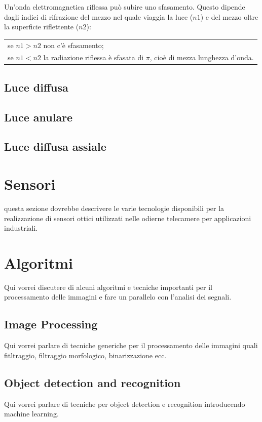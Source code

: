 Un'onda elettromagnetica riflessa può subire uno sfasamento. Questo dipende dagli indici di rifrazione del mezzo nel quale viaggia la luce ($n1$) e del mezzo oltre la superficie riflettente ($n2$):

\begin{tabular}{l}
se $n1>n2$ non c'è sfasamento;\\
se $n1<n2$ la radiazione riflessa è sfasata di $\pi$, cioè di mezza lunghezza d'onda.\\
\end{tabular}

\subsection{Luce diffusa}

\subsection{Luce anulare}

\subsection{Luce diffusa assiale}

\section{Sensori}

questa sezione dovrebbe descrivere le varie tecnologie disponibili per la realizzazione di
sensori ottici utilizzati nelle odierne telecamere per applicazioni industriali.

\section{Algoritmi}
Qui vorrei discutere di alcuni algoritmi e tecniche importanti per il processamento delle immagini
e fare un parallelo con l'analisi dei segnali.

\subsection{Image Processing}
Qui vorrei parlare di tecniche generiche per il processamento delle immagini quali fitltraggio, filtraggio
morfologico, binarizzazione ecc.

\subsection{Object detection and recognition}	
Qui vorrei parlare di tecniche per object detection e recognition introducendo machine learning.

\endinput